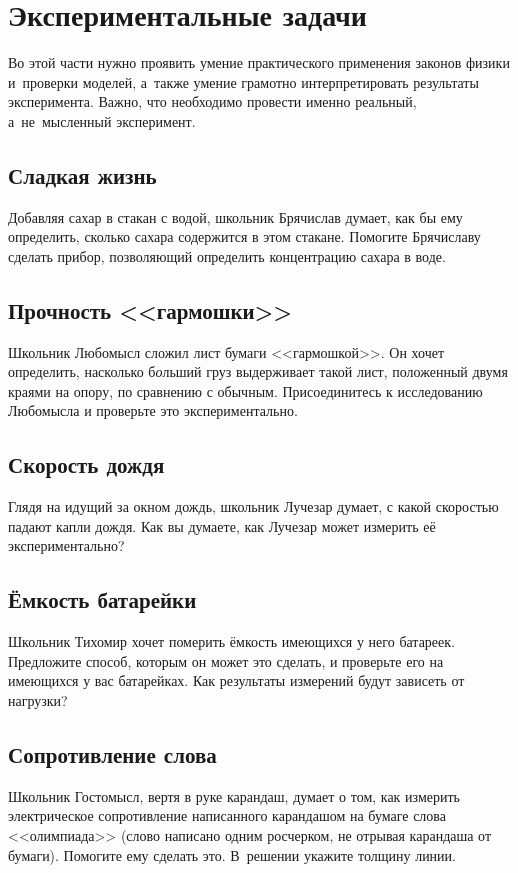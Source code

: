 \documentclass[a4paper,12pt]{article}
\begin{document}
\newpage

\section{Экспериментальные задачи}

Во этой части нужно проявить умение практического применения законов физики
и~проверки моделей, а~также умение грамотно интерпретировать результаты
эксперимента. Важно, что необходимо провести именно реальный,
а~не~мысленный эксперимент.

\subsection{Сладкая жизнь}
Добавляя сахар в стакан с водой, школьник Брячислав думает, как бы ему определить,
сколько сахара содержится в этом стакане. Помогите Брячиславу сделать прибор, позволяющий
определить концентрацию сахара в воде.

\subsection{Прочность <<гармошки>>}
Школьник Любомысл сложил лист бумаги <<гармошкой>>. Он хочет определить, насколько б\emph{о}льший
груз выдерживает такой лист, положенный двумя краями на опору, по сравнению с обычным.
Присоединитесь к исследованию Любомысла и проверьте это экспериментально.

\subsection{Скорость дождя}
Глядя на идущий за окном дождь, школьник Лучезар думает, с какой скоростью падают капли дождя.
Как вы думаете, как Лучезар может измерить её экспериментально?

\subsection{Ёмкость батарейки}
Школьник Тихомир хочет померить ёмкость имеющихся у него батареек. Предложите способ,
которым он может это сделать, и проверьте его на имеющихся у вас батарейках.
Как результаты измерений будут зависеть от нагрузки?

\subsection{Сопротивление слова}
Школьник Гостомысл, вертя в руке карандаш, думает о том, как измерить электрическое
сопротивление написанного карандашом на бумаге слова <<олимпиада>> (слово написано
одним росчерком, не отрывая карандаша от бумаги). Помогите ему сделать это.
В~решении укажите толщину линии.
\end{document}
